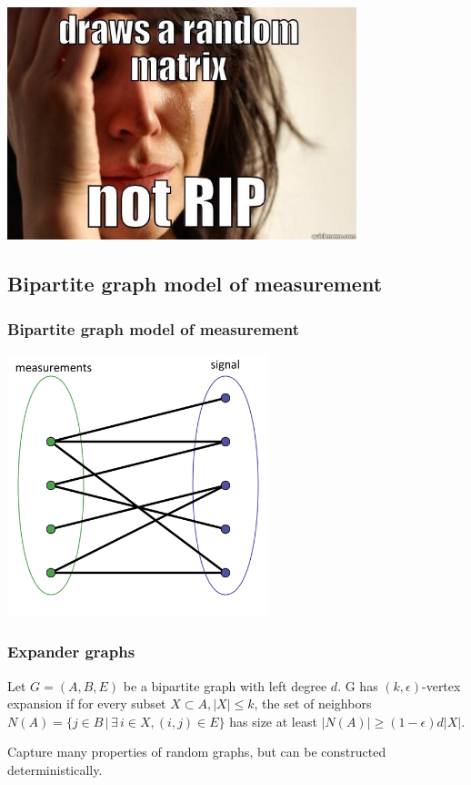 \documentclass[aspectratio=34]{beamer}
\theoremstyle{plain}
\begin{document}
\begin{frame}
\includegraphics[width=4in]{rip.jpg}
\end{frame}


\subsection{Bipartite graph model of measurement}
\begin{frame}
\frametitle{Bipartite graph model of measurement}	
\includegraphics[width=3in]{bpgraph.png}
\end{frame}

\begin{frame}
\frametitle{Expander graphs}

\begin{definition}
	Let $G = (A,B,E)$ be a bipartite graph with left degree $d$. G has $(k,\epsilon)$-vertex expansion if for every subset $X \subset A, |X| \le k$, the set of neighbors $N(A) = \{j \in B \, | \, \exists \, i \in X, (i,j) \in E\}$ has size at least $|N(A)| \ge (1-\epsilon)d|X|$.
\end{definition}

Capture many properties of random graphs, but can be constructed deterministically. 

\end{frame}
\end{document}
